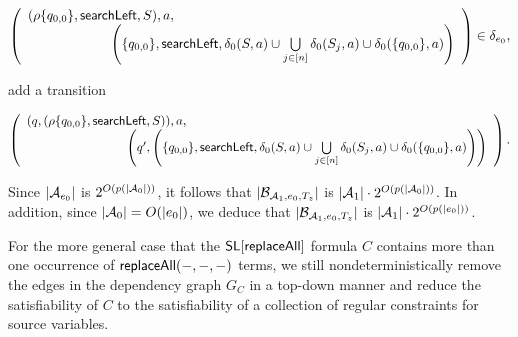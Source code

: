 \begin{enumerate}
\begin{itemize}
\medskip

		$\left(
		\begin{array}{l l}
		(\rho \{q_{0,0}\}, \searchleft, S), a, &\\
		& \hspace{-2cm} \left(\{q_{0,0}\}, \searchleft, \delta_0(S,a) \cup \bigcup \limits_{j \in [n]} \delta_0(S_j, a) \cup \delta_0(\{q_{0,0}\}, a) \right)
		\end{array}
		\right) \in \delta_{e_0},$

\medskip

add a transition

\medskip
		$\left(
		\begin{array}{l l}
		(q, (\rho \{q_{0,0}\}, \searchleft, S)), a, &\\
		& \hspace{-2cm} \left(q', \left(\{q_{0,0}\}, \searchleft, \delta_0(S,a) \cup \bigcup \limits_{j \in [n]} \delta_0(S_j, a) \cup \delta_0(\{q_{0,0}\}, a) \right)\right)
		\end{array}
		\right).$
\medskip

\end{itemize}
\end{enumerate}
Since $|\mathcal{A}_{e_0}|$ is $2^{O(p(|\mathcal{A}_0|))}$, it follows that $|\mathcal{B}_{\mathcal{A}_1, e_0, T_z}|$ is $|\mathcal{A}_1| \cdot 2^{O(p(|\mathcal{A}_0|))}$. In addition, since $|\mathcal{A}_0|=O(|e_0|)$, we deduce that $|\mathcal{B}_{\mathcal{A}_1, e_0, T_z}|$ is $|\mathcal{A}_1| \cdot 2^{O(p(|e_0|))}$.


For the more general case that the $\mathsf{SL}[\mathsf{replaceAll}]$ formula $C$ contains more than one occurrence of $\mathsf{replaceAll}(-, -, -)$ terms, we still nondeterministically remove the edges in the dependency graph $G_C$ in a top-down manner and reduce the satisfiability of $C$ to the satisfiability of a collection of regular constraints for source variables.

